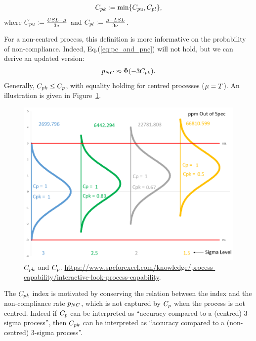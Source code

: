 \begin{definition}[$\cpk$]
\begin{align}
	C_{pk}:= \min\{ C_{pu},C_{pl} \},
\end{align}
where $C_{pu}:= \frac{USL- \mu}{3 \sigma}$ and $C_{pl}:= \frac{\mu-LSL}{3 \sigma}$.
\end{definition}
For a non-centred process, this definition is more informative on the probability of non-compliance.
Indeed, Eq.(\ref{eq:pc_and_pnc}) will not hold, but we can derive an updated version:
\begin{align}
	 p_{NC} \approx \Phi(-3 C_{pk}).
\end{align}
Generally, $C_{pk} \leq C_p$, with equality holding for centred processes ($\mu=T$).
An illustration is given in Figure~\ref{fig:cpk}.


\begin{figure}
\centering
\includegraphics[height=0.3\textheight]{art/Cpk_same_sigma_varying_avg}
\caption[$\cpk$ and $\cp$]{$\cpk$ and $\cp$. \newline
\url{https://www.spcforexcel.com/knowledge/process-capability/interactive-look-process-capability}.}
\label{fig:cpk}
\end{figure}



The $\cpk$ index is motivated by conserving the relation between the index and the non-compliance rate $p_{NC}$, which is not captured by $\cp$ when the process is not centred. 
Indeed if $\cp$ can be interpreted as ``accuracy compared to a (centred) 3-sigma process'', then $\cpk$ can be interpreted as ``accuracy compared to a (non-centred) 3-sigma process''.

